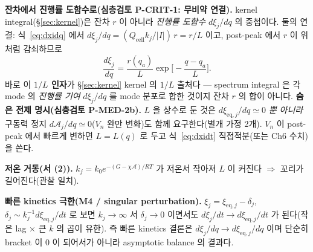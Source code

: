 \documentclass[11pt,a4paper]{article}
\newcommand{\eq}{\mathrm{eq}}
\newcommand{\cell}{\mathrm{cell}}
\begin{document}
\textbf{잔차에서 진행률 도함수로(심층검토 P-CRIT-1: 무비약 연결).} kernel integral(\S\ref{sec:kernel})은
잔차 $r$ 이 아니라 \emph{진행률 도함수} $d\xi_j/dq$ 의 중첩이다. 둘의 연결: 식~\eqref{eq:dxidq} 에서
$d\xi_j/dq=(Q_\cell k_j/|I|)\,r=r/L$ 이고, post-peak 에서 $r$ 이 위처럼 감쇠하므로
\begin{equation}
\frac{d\xi_j}{dq}=\frac{r(q_a)}{L}\exp\!\Big[-\frac{q-q_a}{L}\Big].
\label{eq:single_dxidq}
\end{equation}
바로 이 \textbf{$1/L$ 인자}가 \S\ref{sec:kernel} kernel 의 $1/L$ 출처다 — spectrum integral 은 각 mode 의
\emph{진행률 기여} $d\xi_j/dq$ 를 mode 분포로 합한 것이지 잔차 $r$ 의 합이 아니다.
\textbf{숨은 전제 명시(심층검토 P-MED-2b).} $L$ 을 상수로 둔 것은 $d\xi_{\eq,j}/dq\simeq0$ \emph{뿐 아니라}
구동력 정지 $d\mathcal A_j/dq\simeq0$($V_n$ 완만 변화)도 함께 요구한다(별개 가정 2개). $V_n$ 이 post-peak
에서 빠르게 변하면 $L=L(q)$ 로 두고 식~\eqref{eq:dxidt} 직접적분(또는 Ch6 수치)을 쓴다.

\textbf{저온 거동(서 (2)).} $k_j=k_0e^{-(G-\chi\mathcal A)/RT}$ 가 저온서 작아져 $L$ 이 커진다
$\Rightarrow$ 꼬리가 길어진다(관찰 일치).

\textbf{빠른 kinetics 극한(M4 / singular perturbation).} $\xi_j=\xi_{\eq,j}-\delta_j$,
$\delta_j\sim k_j^{-1}d\xi_{\eq,j}/dt$ 로 보면 $k_j\to\infty$ 서 $\delta_j\to0$ 이면서도
$d\xi_j/dt\to d\xi_{\eq,j}/dt$ 가 된다(작은 lag $\times$ 큰 $k$ 의 곱이 유한). 즉 빠른 kinetics 결론은
$d\xi_j/dq\to d\xi_{\eq,j}/dq$ 이며 단순히 bracket 이 0 이 되어서가 아니라 asymptotic balance 의 결과다.

\end{document}
